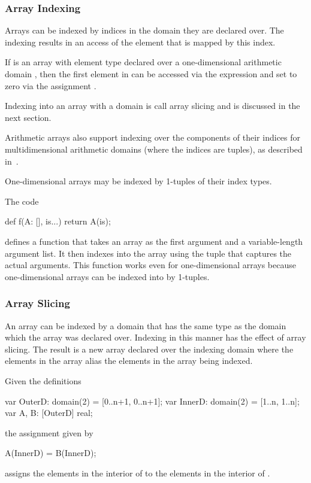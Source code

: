 \subsubsection{Array Indexing}
\label{Array_Indexing}

Arrays can be indexed by indices in the domain they are declared over.
The indexing results in an access of the element that is mapped by
this index.

\begin{example}
If  is an array with element type  declared over a
one-dimensional arithmetic domain \chpl{[1..n]}, then the first
element in  can be accessed via the expression  and
set to zero via the assignment .
\end{example}

Indexing into an array with a domain is call array slicing and is
discussed in the next section.

Arithmetic arrays also support indexing over the components of their
indices for multidimensional arithmetic domains (where the indices are
tuples), as described in~.

One-dimensional arrays may be indexed by 1-tuples of their index
types.
\begin{example}
The code
\begin{chapel}
def f(A: [], is...)
  return A(is);
\end{chapel}
defines a function that takes an array as the first argument and a
variable-length argument list.  It then indexes into the array using
the tuple that captures the actual arguments.  This function works
even for one-dimensional arrays because one-dimensional arrays can be
indexed into by 1-tuples.
\end{example}

\subsubsection{Array Slicing}
\label{Array_Slicing}

An array can be indexed by a domain that has the same type as the
domain which the array was declared over.  Indexing in this manner has
the effect of array slicing.  The result is a new array declared over
the indexing domain where the elements in the array alias the elements
in the array being indexed.

\begin{example}
Given the definitions
\begin{chapel}
var OuterD: domain(2) = [0..n+1, 0..n+1];
var InnerD: domain(2) = [1..n, 1..n];
var A, B: [OuterD] real;
\end{chapel}
the assignment given by
\begin{chapel}
A(InnerD) = B(InnerD);
\end{chapel}
assigns the elements in the interior of  to the elements in
the interior of .
\end{example}

